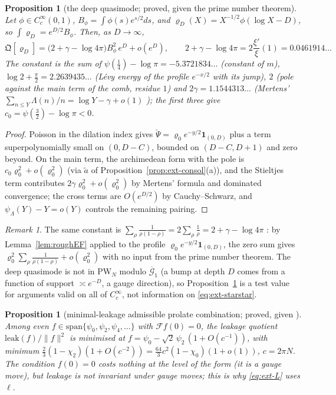 \documentclass[11pt]{amsart}
\newtheorem{proposition}[theorem]{Proposition}
\theoremstyle{definition}
\theoremstyle{remark}
\newtheorem{remark}[theorem]{Remark}
\begin{document}
\begin{proposition}[the deep quasimode; proved, given the prime number theorem]\label{prop:ext-deep}
Let $\phi\in C_c^\infty(0,1)$, $B_\phi=\int\phi(s)e^{s/2}ds$, and $\varrho_D(X)=X^{-1/2}\phi(\log X-D)$, so $\int\varrho_D=e^{D/2}B_\phi$. Then,
as $D\to\infty$,
\[
\mathfrak Q[\varrho_D]=\Big(2+\gamma-\log4\pi\Big)B_\phi^2\,e^{D}+o(e^D),\qquad
2+\gamma-\log4\pi=2\frac{\xi'}{\xi}(1)=0.0461914\ldots
\]
The constant is the sum of $\psi(\frac14)-\log\pi=-5.3721834\ldots$ (constant of $m$), $\log2+\frac\pi2=2.2639435\ldots$ (L\'evy energy
of the profile $e^{-x/2}$ with its jump), $2$ (pole against the main term of the comb, residue $1$) and $2\gamma=1.1544313\ldots$
(Mertens' $\sum_{n\le Y}\Lambda(n)/n=\log Y-\gamma+o(1)$ \cite{MontgomeryVaughan2007}); the first three give
$c_0=\psi(\frac32)-\log\pi<0$.
\end{proposition}
\begin{proof}
Poisson in the dilation index gives $\check\Psi=\varrho_0e^{-y/2}\mathbf 1_{(0,D)}$ plus a term superpolynomially small on $(0,D-C)$,
bounded on $(D-C,D+1)$ and zero beyond. On the main term, the archimedean form with the pole is
$c_0\varrho_0^2+o(\varrho_0^2)$ (via $\tilde a$ of Proposition~\ref{prop:ext-consol}(a)), and the Stieltjes term contributes
$2\gamma\varrho_0^2+o(\varrho_0^2)$ by Mertens' formula and dominated convergence; the cross terms are $O(e^{D/2})$ by
Cauchy--Schwarz, and $\psi_\Lambda(Y)-Y=o(Y)$ controls the remaining pairing.
\end{proof}

\begin{remark}\label{rem:ext-deep}
The same constant is $\sum_\rho\frac1{\rho(1-\rho)}=2\sum_\rho\frac1\rho=2+\gamma-\log4\pi$ \cite[Ch.~12]{Davenport2000}: by
Lemma~\ref{lem:roughEF} applied to the profile $\varrho_0e^{-y/2}\mathbf 1_{(0,D)}$, the zero sum gives
$\varrho_0^2\sum_\rho\frac1{\rho(1-\rho)}+o(\varrho_0^2)$ with no input from the prime number theorem. The deep quasimode
is not in $\mathrm{PW}_N$ modulo $\overline{\mathcal G}_1$ (a bump at depth $D$ comes from a function of support $\asymp e^{-D}$, a gauge
direction), so Proposition~\ref{prop:ext-deep} is a test value for arguments valid on all of $C_c^\infty$, not information on
\eqref{eq:ext-starstar}.
\end{remark}

\begin{proposition}[minimal-leakage admissible prolate combination; proved, given \cite{SlepianPollak1961,Fuchs1964}]\label{prop:ext-K1b}
Among even $f\in\mathrm{span}\{\psi_0,\psi_2,\psi_4,\dots\}$ with $\mathcal Ff(0)=0$, the leakage quotient $\mathrm{leak}(f)/\|f\|^2$ is
minimised at $f=\psi_0-\sqrt2\,\psi_2\,(1+O(c^{-1}))$, with minimum $\frac23(1-\chi_2)(1+O(c^{-2}))=\frac{64}3c^2(1-\chi_0)(1+o(1))$,
$c=2\pi N$. The condition $f(0)=0$ costs nothing at the level of the form (it is a gauge move), but leakage is not invariant under
gauge moves; this is why \eqref{eq:ext-L} uses $\ell$.
\end{proposition}
\end{document}
